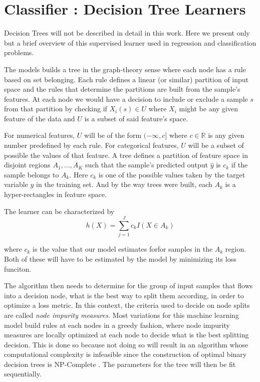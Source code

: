 \documentclass{article}%
\theoremstyle{definition}
\begin{document}
\section{Classifier : Decision Tree Learners}

Decision Trees will not be described in detail in this work. Here we present only but a brief overview of this supervised learner used in regression and classification problems.

The models builds a tree in the graph-theory sense where each node has a rule based on set belonging. Each rule defines a linear (or similar) partition of input space and the rules that determine the partitions are built from the sample's features. At each node we would have a decision to include or exclude a sample $s$ from that partition by checking if $X_i(s) \in U$ where $X_i$ might be any given feature of the data and $U$ is a subset of said feature's space.

For numerical features, $U$ will be of the form $(-\infty,c]$ where $c \in \mathbb{R}$ is any given number predefined by each rule. For categorical features, $U$ will be a subset of possible the values of that feature. A tree defines a partition of feature space in disjoint regions $A_1,...,A_K$ such that the sample's predicted output $\hat{y}$ is $c_k$ if the sample belongs to $A_k$. Here $c_k$ is one of the possible values taken by the target variable $y$ in the training set. And by the way trees were built, each $A_k$ is a hyper-rectangles in feature space.

The learner can be characterized by 
\[
h(X) = \sum_{j=1}^J c_k I(X \in A_k)
\]\label{equation-decisionTreeModel}

where $c_k$ is the value that our model estimates forfor samples in the $A_k$ region. Both of these will have to be estimated by the model by minimizing its loss funciton.

The algorithm then needs to determine for the group of input samples that flows into a decision node, what is the best way to split them according, in order to optimize a loss metric. In this context, the criteria used to decide on node splits are called \textit{node impurity measures}. Most variations for this machine learning model build rules at each nodes in a greedy fashion, where node impurity measures are locally optimized at each node to decide what is the best splitting decision. This is done so because not doing so will result in an algorithm whose computational complexity is infeasible since the construction of optimal binary decision trees is NP-Complete \cite{decisionTreesNP}. The parameters for the tree will then be fit sequentially.
\end{document}
